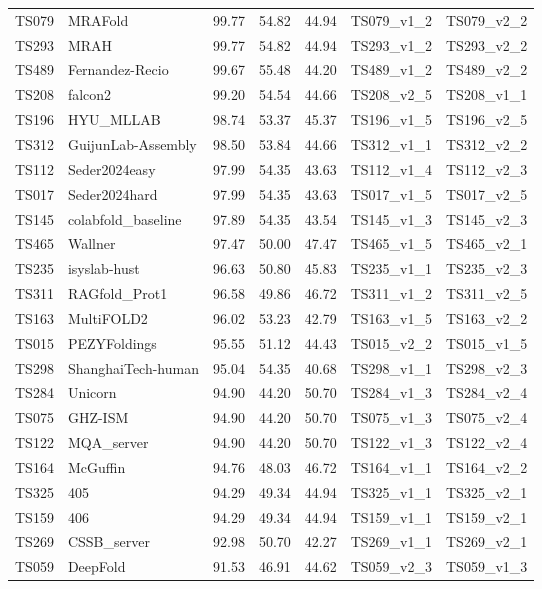 \begin{table}[ht]
{\begin{tabular}{llrrrll}
TS079 & MRAFold & 99.77 & 54.82 & 44.94 & TS079\_v1\_2 & TS079\_v2\_2 \\ 
TS293 & MRAH & 99.77 & 54.82 & 44.94 & TS293\_v1\_2 & TS293\_v2\_2 \\ 
TS489 & Fernandez-Recio & 99.67 & 55.48 & 44.20 & TS489\_v1\_2 & TS489\_v2\_2 \\ 
TS208 & falcon2 & 99.20 & 54.54 & 44.66 & TS208\_v2\_5 & TS208\_v1\_1 \\ 
TS196 & HYU\_MLLAB & 98.74 & 53.37 & 45.37 & TS196\_v1\_5 & TS196\_v2\_5 \\ 
TS312 & GuijunLab-Assembly & 98.50 & 53.84 & 44.66 & TS312\_v1\_1 & TS312\_v2\_2 \\ 
TS112 & Seder2024easy & 97.99 & 54.35 & 43.63 & TS112\_v1\_4 & TS112\_v2\_3 \\ 
TS017 & Seder2024hard & 97.99 & 54.35 & 43.63 & TS017\_v1\_5 & TS017\_v2\_5 \\ 
TS145 & colabfold\_baseline & 97.89 & 54.35 & 43.54 & TS145\_v1\_3 & TS145\_v2\_3 \\ 
TS465 & Wallner & 97.47 & 50.00 & 47.47 & TS465\_v1\_5 & TS465\_v2\_1 \\ 
TS235 & isyslab-hust & 96.63 & 50.80 & 45.83 & TS235\_v1\_1 & TS235\_v2\_3 \\ 
TS311 & RAGfold\_Prot1 & 96.58 & 49.86 & 46.72 & TS311\_v1\_2 & TS311\_v2\_5 \\ 
TS163 & MultiFOLD2 & 96.02 & 53.23 & 42.79 & TS163\_v1\_5 & TS163\_v2\_2 \\ 
TS015 & PEZYFoldings & 95.55 & 51.12 & 44.43 & TS015\_v2\_2 & TS015\_v1\_5 \\ 
TS298 & ShanghaiTech-human & 95.04 & 54.35 & 40.68 & TS298\_v1\_1 & TS298\_v2\_3 \\ 
TS284 & Unicorn & 94.90 & 44.20 & 50.70 & TS284\_v1\_3 & TS284\_v2\_4 \\ 
TS075 & GHZ-ISM & 94.90 & 44.20 & 50.70 & TS075\_v1\_3 & TS075\_v2\_4 \\ 
TS122 & MQA\_server & 94.90 & 44.20 & 50.70 & TS122\_v1\_3 & TS122\_v2\_4 \\ 
TS164 & McGuffin & 94.76 & 48.03 & 46.72 & TS164\_v1\_1 & TS164\_v2\_2 \\ 
TS325 & 405 & 94.29 & 49.34 & 44.94 & TS325\_v1\_1 & TS325\_v2\_1 \\ 
TS159 & 406 & 94.29 & 49.34 & 44.94 & TS159\_v1\_1 & TS159\_v2\_1 \\ 
TS269 & CSSB\_server & 92.98 & 50.70 & 42.27 & TS269\_v1\_1 & TS269\_v2\_1 \\ 
TS059 & DeepFold & 91.53 & 46.91 & 44.62 & TS059\_v2\_3 & TS059\_v1\_3 \\ 

\end{tabular}}
\end{table}
